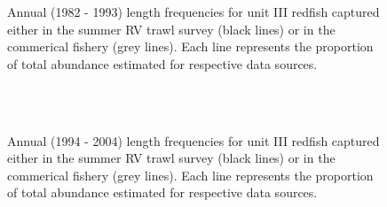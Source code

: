 \documentclass[11pt]{article}
\newcommand{\D}{.}
\newcommand{\e}{/home/ecomod_data/redfish/figures/}
\begin{document}
\begin{landscape}
\begin{figure}
\caption{Annual (1982 - 1993) length frequencies for unit III redfish captured either in the summer RV trawl survey (black lines) or in the commerical fishery (grey lines). Each line represents the proportion of total abundance estimated for respective data sources.}
\end{figure}
\clearpage

\begin{figure}
\centering
\ContinuedFloat
{}
\\
\\
\caption{Annual (1994 - 2004) length frequencies for unit III redfish captured either in the summer RV trawl survey (black lines) or in the commerical fishery (grey lines). Each line represents the proportion of total abundance estimated for respective data sources.}

\end{figure}
\clearpage


\end{landscape}
\end{document}
